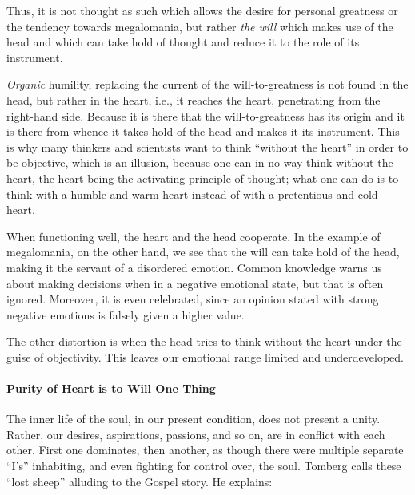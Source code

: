 \begin{quotationx}
Thus, it is not thought as such which allows the desire for personal greatness or the tendency towards megalomania, but
rather \emph{the will }which makes use of the head and which can take hold of thought and reduce it to the role of its
instrument.

\emph{Organic} humility, replacing the current of the will-to-greatness is not found in the head, but rather in the
heart, i.e., it reaches the heart, penetrating from the right-hand side. Because it is there that the will-to-greatness
has its origin and it is there from whence it takes hold of the head and makes it its instrument. This is why many
thinkers and scientists want to think “without the heart” in order to be objective, which is an illusion, because one
can in no way think without the heart, the heart being the activating principle of thought; what one can do is to think
with a humble and warm heart instead of with a pretentious and cold heart. 

\end{quotationx}
When functioning well, the heart and the head cooperate. In the example of megalomania, on the other hand, we see that
the will can take hold of the head, making it the servant of a disordered emotion. Common knowledge warns us about
making decisions when in a negative emotional state, but that is often ignored. Moreover, it is even celebrated, since
an opinion stated with strong negative emotions is falsely given a higher value.

The other distortion is when the head tries to think without the heart under the guise of objectivity. This leaves our
emotional range limited and underdeveloped.

\paragraph{Purity of Heart is to Will One Thing}
The inner life of the soul, in our present condition, does not present a unity. Rather, our desires, aspirations,
passions, and so on, are in conflict with each other. First one dominates, then another, as though there were multiple
separate “I's” inhabiting, and even fighting for control over, the soul. Tomberg calls these “lost
sheep” alluding to the Gospel story. He explains:

